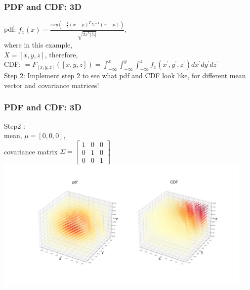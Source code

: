\documentclass{beamer}
\begin{document}
\begin{frame}
\frametitle{PDF and CDF: 3D}
pdf: $f_x (x) = \frac{exp(-\frac{1}{2}(x-\mu)^T\Sigma^{-1} (x-\mu))}{\sqrt{{2\pi}^k|\Sigma|}}$, \newline\\
where in this example,\newline\\
$ X=[x,y,z]$, therefore,\newline\\
CDF: $=F_{[x,y,z]}([x,y,z]) = \int_{-\infty}^{x}\int_{-\infty}^{y}\int_{-\infty}^{z} f_x(x^{'},y^{'},z^{'})dx^{'}dy^{'}dz^{'} $\newline\\

Step 2:
Implement step 2 to see what pdf and CDF look like, for different mean vector and covariance matrices!
\end{frame}

\begin{frame}
\frametitle{PDF and CDF: 3D}
Step2 :
\\mean, $\mu = [0,0,0]$,\\
covariance matrix $\Sigma = \begin{bmatrix}
    1 & 0&0 \\
    0&1&0\\
    0&0&1
\end{bmatrix}$\newline\\
\includegraphics[height=6.5cm]{3D-1.png}
\end{frame}
\end{document}
